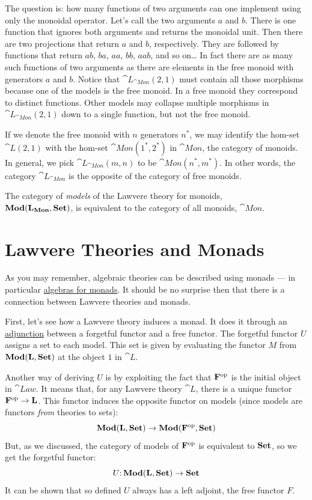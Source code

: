 The question is: how many functions of two arguments can one implement
using only the monoidal operator. Let's call the two arguments
$a$ and $b$. There is one function that ignores both
arguments and returns the monoidal unit. Then there are two projections
that return $a$ and $b$, respectively. They are followed
by functions that return $ab$, $ba$, $aa$,
$bb$, $aab$, and so on\ldots{} In fact there are as many
such functions of two arguments as there are elements in the free monoid
with generators $a$ and $b$. Notice that
$\cat{L}_{\cat{Mon}}(2, 1)$ must contain all those morphisms because one of the
models is the free monoid. In a free monoid they correspond to distinct
functions. Other models may collapse multiple morphisms in
$\cat{L}_{\cat{Mon}}(2, 1)$ down to a single function, but not the free monoid.

If we denote the free monoid with $n$ generators $n^*$, we may
identify the hom-set $\cat{L}(2, 1)$ with the hom-set
$\cat{Mon}(1^*, 2^*)$ in $\cat{Mon}$, the category of monoids. In
general, we pick $\cat{L}_{\cat{Mon}}(m, n)$ to be $\cat{Mon}(n^*, m^*)$. In
other words, the category $\cat{L}_{\cat{Mon}}$ is the opposite of the category
of free monoids.

The category of \emph{models} of the Lawvere theory for monoids,\\
$\mathbf{Mod}(\mathbf{L}_{\mathbf{Mon}}, \mathbf{Set})$, is equivalent to the category of all monoids,
$\cat{Mon}$.

\section{Lawvere Theories and Monads}

As you may remember, algebraic theories can be described using monads
--- in particular
\hyperref[algebras-for-monads]{algebras
	for monads}. It should be no surprise then that there is a connection
between Lawvere theories and monads.

First, let's see how a Lawvere theory induces a monad. It does it
through an
\hyperref[free-forgetful-adjunctions]{adjunction}
between a forgetful functor and a free functor. The forgetful functor
$U$ assigns a set to each model. This set is given by evaluating
the functor $M$ from $\mathbf{Mod}(\mathbf{L}, \mathbf{Set})$ at the object $1$ in
$\cat{L}$.

Another way of deriving $U$ is by exploiting the fact that
$\mathbf{F}^{\mathrm{op}}$ is the initial object in $\cat{Law}$. It
means that, for any Lawvere theory $\cat{L}$, there is a unique
functor $\mathbf{F}^{\mathrm{op}} \to \mathbf{L}$. This functor induces the
opposite functor on models (since models are functors \emph{from}
theories to sets):
\[\mathbf{Mod}(\mathbf{L}, \mathbf{Set}) \to \mathbf{Mod}(\mathbf{F}^{\mathrm{op}}, \mathbf{Set})\]
But, as we discussed, the category of models of
$\mathbf{F}^{\mathrm{op}}$ is equivalent to $\mathbf{Set}$, so we get
the forgetful functor:
\[U \mathpunct{:} \mathbf{Mod}(\mathbf{L}, \mathbf{Set}) \to \mathbf{Set}\]
It can be shown that so defined $U$ always has a left adjoint,
the free functor $F$.

